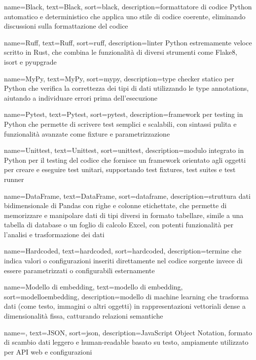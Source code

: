  {
    name=Black,
    text=Black,
    sort=black,
    description={formattatore di codice Python automatico e deterministico che applica uno stile di codice coerente, eliminando discussioni sulla formattazione del codice}
}

 {
    name=Ruff,
    text=Ruff,
    sort=ruff,
    description={linter Python estremamente veloce scritto in Rust, che combina le funzionalità di diversi strumenti come Flake8, isort e pyupgrade}
}

 {
    name=MyPy,
    text=MyPy,
    sort=mypy,
    description={type checker statico per Python che verifica la correttezza dei tipi di dati utilizzando le type annotations, aiutando a individuare errori prima dell'esecuzione}
}

 {
    name=Pytest,
    text=Pytest,
    sort=pytest,
    description={framework per testing in Python che permette di scrivere test semplici e scalabili, con sintassi pulita e funzionalità avanzate come fixture e parametrizzazione}
}

 {
    name=Unittest,
    text=Unittest,
    sort=unittest,
    description={modulo integrato in Python per il testing del codice che fornisce un framework orientato agli oggetti per creare e eseguire test unitari, supportando test fixtures, test suites e test runner}
}

 {
    name=DataFrame,
    text=DataFrame,
    sort=dataframe,
    description={struttura dati bidimensionale di Pandas con righe e colonne etichettate, che permette di memorizzare e manipolare dati di tipi diversi in formato tabellare, simile a una tabella di database o un foglio di calcolo Excel, con potenti funzionalità per l'analisi e trasformazione dei dati}
}

 {
    name=Hardcoded,
    text=hardcoded,
    sort=hardcoded,
    description={termine che indica valori o configurazioni inseriti direttamente nel codice sorgente invece di essere parametrizzati o configurabili esternamente}
}

 {
    name=Modello di embedding,
    text=modello di embedding,
    sort=modelloembedding,
    description={modello di machine learning che trasforma dati (come testo, immagini o altri oggetti) in rappresentazioni vettoriali dense a dimensionalità fissa, catturando relazioni semantiche}
}

 {
    name=,
    text=JSON,
    sort=json,
    description={JavaScript Object Notation, formato di scambio dati leggero e human-readable basato su testo, ampiamente utilizzato per API web e configurazioni}
}

